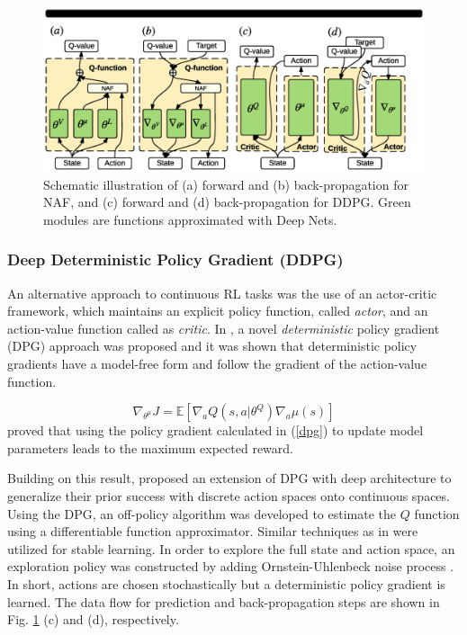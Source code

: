 \documentclass[../thesis.tex]{subfiles}
\begin{document}
\begin{figure}[t]
      \begin{center}
   \centerline{\includegraphics[width=0.8\columnwidth,trim= 80 900 110 70, clip=true]{./MultimodalDRL/fig/naf_ddpg}}
      \caption{Schematic illustration of (a) forward and (b) back-propagation for NAF, and (c) forward and (d) back-propagation for DDPG. Green modules are functions approximated with Deep Nets.}
      \label{fig:CDQN-DDPG}
      \end{center}
\end{figure}
 
\subsubsection{Deep Deterministic Policy Gradient (DDPG)}
An alternative approach to continuous RL tasks was the use of an actor-critic framework, which maintains an explicit policy function, called \textit{actor}, and an action-value function called as \textit{critic}. In \citet{dpg}, a novel \emph{deterministic} policy gradient (DPG) approach was proposed and it was shown that deterministic policy gradients have a model-free form and follow the gradient of the action-value function.
 
\begin{equation}
\nabla_{\theta^\mu} J = \mathbb{E}[\nabla_a Q(s,a|\theta^Q) \nabla_a \mu(s)]
\label{dpg}
\end{equation}
\citet{dpg} proved that using the policy gradient calculated in (\ref{dpg}) to update model parameters leads to the maximum expected reward.
 
Building on this result, \citet{DBLP:journals/corr/LillicrapHPHETS15} proposed an extension of DPG with deep architecture to generalize their prior success with discrete action spaces \cite{mnih2015human} onto continuous spaces. Using the DPG, an off-policy algorithm was developed to estimate the $Q$ function using a differentiable function approximator. Similar techniques as in \cite{mnih2015human} were utilized for stable learning. In order to explore the full state and action space, an exploration policy was constructed by adding Ornstein-Uhlenbeck noise process \cite{uhlenbeck1930theory}. In short, actions are chosen stochastically but a deterministic policy gradient is learned. The data flow for prediction and back-propagation steps are shown in Fig. \ref{fig:CDQN-DDPG} (c) and (d), respectively.
 
\end{document}
